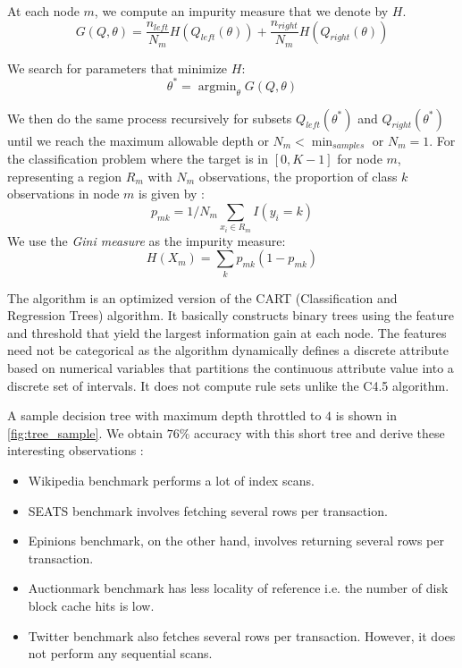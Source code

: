 At each node $m$, we compute an impurity measure that we denote by $H$.
$$G(Q,\theta) = \frac{n_{left}}{N_m} H(Q_{left}(\theta)) +
\frac{n_{right}}{N_m} H(Q_{right}(\theta))$$

We search for parameters that minimize $H$:
$$\theta^* = \operatorname{argmin}_\theta G(Q,\theta)$$

We then do the same process recursively for subsets $Q_{left}(\theta^*)$ and
$Q_{right}(\theta^*)$ until we reach the maximum allowable depth or $N_m
< \min_{samples}$ or $N_m = 1$.
For the classification problem where the target is in $[ 0, K-1]$
for node $m$, representing a region $R_m$ with $N_m$ observations, 
the proportion of class $k$ observations in node $m$ is given by :
$$p_{mk} = 1/ N_m \sum_{x_i \in R_m} I(y_i = k)$$
We use the \textit{Gini measure} as the impurity measure:
$$H(X_m) = \sum_k p_{mk} (1 - p_{mk})$$

The algorithm is an optimized version of the CART (Classification and Regression
Trees) algorithm\citep{cart84}.
It basically constructs binary trees using the feature and threshold that
yield the largest information gain at each node.
The features need not be categorical as the algorithm dynamically 
defines a discrete attribute based on numerical variables that 
partitions the continuous attribute value into a discrete set of intervals. 
It does not compute rule sets unlike the C4.5 algorithm\citep{quinlan93}.

A sample decision tree with maximum depth throttled to $4$ is shown in
\cref{fig:tree_sample}. We obtain $76\%$ accuracy with this short tree
and derive these interesting observations :

\begin{itemize}
  \item Wikipedia benchmark performs a lot of index scans.
  \item SEATS benchmark involves fetching several rows per transaction.
  \item Epinions benchmark, on the other hand, involves returning several rows
  per transaction.
  \item Auctionmark benchmark has less locality of reference i.e. the number of
  disk block cache hits is low.
  \item Twitter benchmark also fetches several rows per transaction. However, it
  does not perform any sequential scans.
\end{itemize}

